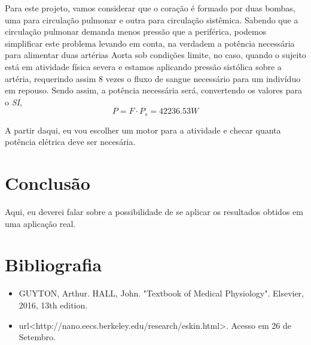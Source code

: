 \documentclass[12pt, a4paper, twoside]{article}
\begin{document}
Para este projeto, vamos considerar que o coração é formado por duas bombas, uma para circulação pulmonar e outra para circulação sistêmica. Sabendo que a circulação pulmonar demanda menos pressão que a periférica, podemos simplificar este problema levando em conta, na verdadem a potência necessária para alimentar duas artérias Aorta sob condições limite, no caso, quando o sujeito está em atividade física severa e estamos aplicando pressão sistólica sobre a artéria, requerindo assim 8 vezes o fluxo de sangue necessário para um indivíduo em repouso. Sendo assim, a potência necessária será, convertendo os valores para o \textit{SI},
$$ P = F \cdot P_s = 42236.53 W $$

A partir daqui, eu vou escolher um motor para a atividade e checar quanta potência elétrica deve ser necesária.

\section{Conclusão}

Aqui, eu deverei falar sobre a possibilidade de se aplicar os resultados obtidos em uma aplicação real.

\section{Bibliografia}

\begin{itemize}
    \item GUYTON, Arthur. HALL, John. "Textbook of Medical Physiology". Elsevier, 2016, 13th edition.
    \item url<http://nano.eecs.berkeley.edu/research/eskin.html>. Acesso em 26 de Setembro.
\end{itemize}
\end{document}
